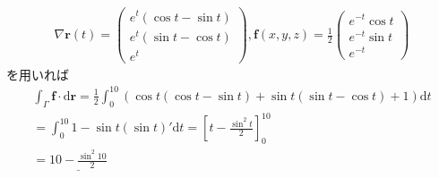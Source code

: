 \documentclass[dvipdfmx]{jsarticle}
\begin{document}
    \subsection{}
      \begin{align*}
        \nabla \bm{r}(t) =
        \begin{pmatrix}
          e^t(\cos t - \sin t)\\
          e^t(\sin t - \cos t)\\
          e^t
        \end{pmatrix}
        , \bm{f}(x, y, z) = \frac{1}{2}
        \begin{pmatrix}
          e^{-t} \cos t\\
          e^{-t} \sin t\\
          e^{-t}
        \end{pmatrix}
      \end{align*}
      を用いれば
      \begin{align*}
        \int_{\Gamma} \bm{f} \cdot \mathrm{d} \bm{r} =\frac{1}{2} \int_{0}^{10} (\cos t (\cos t - \sin t) + \sin t (\sin t - \cos t) + 1) \mathrm{d}t\\
        = \int_{0}^{10} 1 - \sin t (\sin t )' \mathrm{d}t
        = [t - \frac{\sin^2 t}{2}]_{0}^{10}\\
        = \underline{10 - \frac{\sin^2 10}{2}}
      \end{align*}
\end{document}

